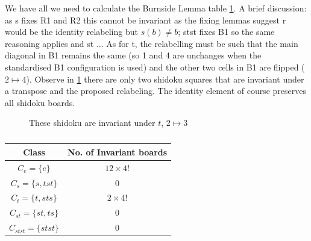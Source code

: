 \documentclass[a4paper,11pt]{report}
\newcounter{row}
\newcounter{col}
\newcounter{rowa}
\newcounter{cola}
\newcommand\setrowa[4]{
  \setcounter{cola}{1}
  \foreach \n in {#1, #2, #3, #4} {
    \edef\x{\value{cola} - 0.5}
    \edef\y{4.5 - \value{rowa}}
    \node[anchor=center] at (\x, \y) {\n};
    \stepcounter{cola}
  }
  \stepcounter{rowa}
}
\begin{document}
We have all we need to calculate the Burnside Lemma table \ref{table:burnside}. A brief discussion: as s fixes R1 and R2 this cannot be invariant as the fixing lemmas suggest r would be the identity relabeling but $s(b)\neq b$; stst fixes B1 so the same reasoning applies and st ... As for t, the relabelling must be such that the main diagonal in B1 remains the same (so 1 and 4 are unchanges when the standardised B1 configuration is used) and the other two cells in B1 are flipped ($2\mapsto 4$). Observe in \ref{fig:transpose} there are only two shidoku squares that are invariant under a transpose and the proposed relabeling. The identity element of course preserves all shidoku boards.

\begin{figure}[h]
\centering
{}
\caption{These shidoku are invariant under $t$, $2\mapsto 3$}
\label{fig:transpose}
\end{figure}

\begin{table}[!h]
\begin{center}
\begin{tabular}{ |c|c| }
 \hline
Class  & No. of Invariant boards\\
 \hline
$C_e=\{e\}$&$12\times 4!$\\
$C_s = \{s,tst\}$&0\\
$C_t = \{t,sts\}$&$2\times4!$\\
$C_{st}=\{st,ts\}$&0\\
$C_{stst}=\{stst\}$&0\\
\hline
\end{tabular}
\end{center}
\caption{\label{table:burnside}}
\end{table}
\end{document}
